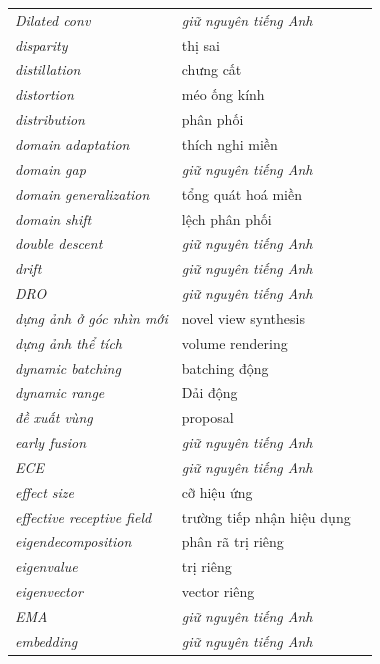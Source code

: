 \documentclass[deep_learning.tex]{subfiles}
\begin{document}
\begin{longtable}{@{}L{5.2cm}L{5.9cm}L{2.6cm}@{}}
\emph{Dilated conv} & \emph{\color{tiercol}giữ nguyên tiếng Anh} & \\
\emph{disparity} & thị sai & \\
\emph{distillation} & chưng cất & \\
\emph{distortion} & méo ống kính & \\
\emph{distribution} & phân phối & \\
\emph{domain adaptation} & thích nghi miền & \\
\emph{domain gap} & \emph{\color{tiercol}giữ nguyên tiếng Anh} & \\
\emph{domain generalization} & tổng quát hoá miền & \\
\emph{domain shift} & lệch phân phối & \\
\emph{double descent} & \emph{\color{tiercol}giữ nguyên tiếng Anh} & \\
\emph{drift} & \emph{\color{tiercol}giữ nguyên tiếng Anh} & \\
\emph{DRO} & \emph{\color{tiercol}giữ nguyên tiếng Anh} & \\
\emph{dựng ảnh ở góc nhìn mới} & novel view synthesis & \\
\emph{dựng ảnh thể tích} & volume rendering & \\
\emph{dynamic batching} & batching động & \\
\emph{dynamic range} & Dải động & \\
\emph{đề xuất vùng} & proposal & \\
\emph{early fusion} & \emph{\color{tiercol}giữ nguyên tiếng Anh} & \\
\emph{ECE} & \emph{\color{tiercol}giữ nguyên tiếng Anh} & \\
\emph{effect size} & cỡ hiệu ứng & \\
\emph{effective receptive field} & trường tiếp nhận hiệu dụng & \\
\emph{eigendecomposition} & phân rã trị riêng & \\
\emph{eigenvalue} & trị riêng & \\
\emph{eigenvector} & vector riêng & \\
\emph{EMA} & \emph{\color{tiercol}giữ nguyên tiếng Anh} & \\
\emph{embedding} & \emph{\color{tiercol}giữ nguyên tiếng Anh} & \\

\end{longtable}
\end{document}
